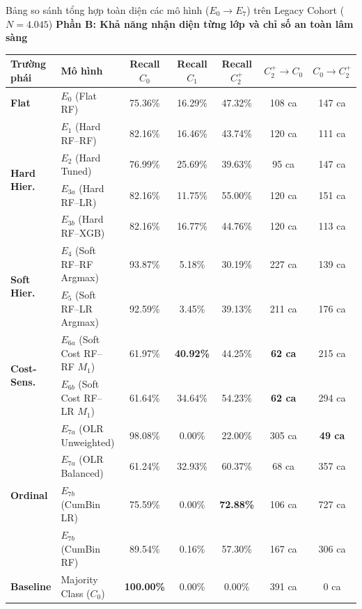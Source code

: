 \begin{table}{Bảng so sánh tổng hợp toàn diện các mô hình ($E_0 \to E_7$) trên Legacy Cohort ($N = 4.045$)}
\vspace{0.35cm}
\textbf{Phần B: Khả năng nhận diện từng lớp và chỉ số an toàn lâm sàng}
\vspace{0.15cm}

\begin{tabularx}{\textwidth}{l X c c c c c}
\toprule
\textbf{Trường phái} & \textbf{Mô hình} & \textbf{Recall $C_0$} & \textbf{Recall $C_1$} & \textbf{Recall $C_2^+$} & \textbf{$C_2^+ \to C_0$} & \textbf{$C_0 \to C_2^+$} \\
\midrule
\textbf{Flat} & $E_0$ (Flat RF) & 75.36\% & 16.29\% & 47.32\% & 108 ca & 147 ca \\
\midrule
\multirow{4}{*}{\textbf{Hard Hier.}} 
  & $E_1$ (Hard RF--RF)   & 82.16\% & 16.46\% & 43.74\% & 120 ca & 111 ca \\
  & $E_2$ (Hard Tuned)    & 76.99\% & 25.69\% & 39.63\% & 95 ca & 147 ca \\
  & $E_{3a}$ (Hard RF--LR) & 82.16\% & 11.75\% & 55.00\% & 120 ca & 151 ca \\
  & $E_{3b}$ (Hard RF--XGB)& 82.16\% & 16.77\% & 44.76\% & 120 ca & 113 ca \\
\midrule
\multirow{2}{*}{\textbf{Soft Hier.}} 
  & $E_4$ (Soft RF--RF Argmax) & 93.87\% & 5.18\% & 30.19\% & 227 ca & 139 ca \\
  & $E_5$ (Soft RF--LR Argmax) & 92.59\% & 3.45\% & 39.13\% & 211 ca & 176 ca \\
\midrule
\multirow{2}{*}{\textbf{Cost-Sens.}}
  & $E_{6a}$ (Soft Cost RF--RF $M_1$) & 61.97\% & \textbf{40.92\%} & 44.25\% & \textbf{62 ca} & 215 ca \\
  & $E_{6b}$ (Soft Cost RF--LR $M_1$) & 61.64\% & 34.64\% & 54.23\% & \textbf{62 ca} & 294 ca \\
\midrule
\multirow{4}{*}{\textbf{Ordinal}} 
  & $E_{7a}$ (OLR Unweighted) & 98.08\% & 0.00\% & 22.00\% & 305 ca & \textbf{49 ca} \\
  & $E_{7a}$ (OLR Balanced)   & 61.24\% & 32.93\% & 60.37\% & 68 ca & 357 ca \\
  & $E_{7b}$ (CumBin LR)      & 75.59\% & 0.00\% & \textbf{72.88\%} & 106 ca & 727 ca \\
  & $E_{7b}$ (CumBin RF)      & 89.54\% & 0.16\% & 57.30\% & 167 ca & 306 ca \\
\midrule
\textbf{Baseline} & Majority Class ($C_0$) & \textbf{100.00\%} & 0.00\% & 0.00\% & 391 ca & 0 ca \\
\bottomrule
\end{tabularx}
\end{table}